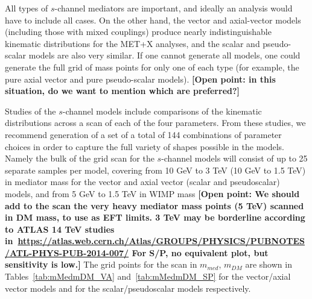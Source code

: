 \documentclass[a4,debug,notitlepage,nobib]{tufte-handout}
\begin{document}
All types of $s$-channel mediators are important, and ideally an analysis 
would have to include all cases. On the other hand, the vector and axial-vector models 
(including those with mixed couplings) produce nearly indistinguishable kinematic distributions 
for the MET+X analyses, and the scalar and pseudo-scalar models are also very similar. 
If one cannot generate all models, one could generate the full grid of mass points for only one of each 
type (for example, the pure axial vector and pure pseudo-scalar models). 
\textbf{[Open point: in this situation, do we want to mention which are preferred?]}

Studies of the $s$-channel models include comparisons of the kinematic
distributions across a scan of each of the four parameters. From these
studies, we recommend generation of a set of a total of 144
combinations of parameter choices in order to capture the full variety
of shapes possible in the models. Namely the bulk of the grid scan for
the $s$-channel models will consist of up to 25 separate
samples per model, covering from 10 GeV to 3 TeV (10 GeV to 1.5 TeV)
in mediator mass for the vector and axial vector (scalar and pseudoscalar) models,
and from 5 GeV to 1.5 TeV in WIMP mass
\textbf{[Open point: We should add to the scan 
the very heavy mediator mass points (5 TeV) scanned in DM mass, to use as EFT limits.  
3 TeV may be borderline according to ATLAS 14 TeV studies 
in~\url{https://atlas.web.cern.ch/Atlas/GROUPS/PHYSICS/PUBNOTES/ATL-PHYS-PUB-2014-007/}
For S/P, no equivalent plot, but sensitivity is low.]}
The grid points for the scan in $m_{med}$, $m_{DM}$ are shown in
Tables~\ref{tab:mMedmDM_VA} and~\ref{tab:mMedmDM_SP} 
for the vector/axial vector models and for the scalar/pseudoscalar models
respectively. 
\end{document}
